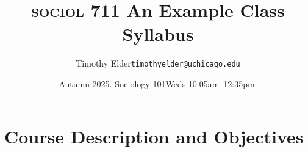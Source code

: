 \documentclass[11pt,article,oneside]{memoir}
\makeatletter
\def\myauthor{Timothy Elder}
\def\mytitle{{\normalsize \textsc{sociol} 711\newline} \HUGE An Example Class Syllabus}
\def\mycopyright{\myauthor}
\def\myemail{timothyelder@uchicago.edu}
\makeatother
\begin{document}
\setsansfont[Mapping=tex-text]{Myriad Pro} 

\def\ind{\hangindent=1 true cm\hangafter=1 \noindent}
\def\labelitemi{$\cdot$}
\renewcommand{\labelitemii}{~}


\title{\LARGE \mytitle}     
\author{\Large\myauthor \newline \footnotesize\texttt{\noindent\myemail}}
\date{Autumn 2025. Sociology 101\newline \textsf{Weds 10:05am--12:35pm.}}

\published{\,}

\maketitle

\section{Course Description and Objectives}

\newpage
\end{document}
